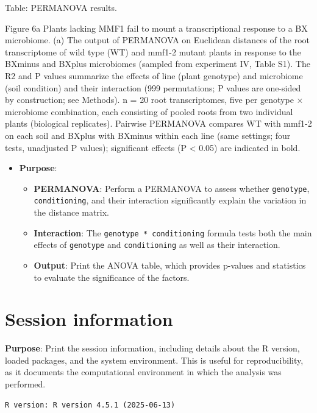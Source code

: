 \documentclass[
  11pt,
]{article}
\providecommand{\tightlist}{%
  \setlength{\itemsep}{0pt}\setlength{\parskip}{0pt}}\usepackage{longtable,booktabs,array}
\begin{document}
Table: PERMANOVA results.

Figure 6a \textbar{} Plants lacking MMF1 fail to mount a transcriptional
response to a BX microbiome. (a) The output of PERMANOVA on Euclidean
distances of the root transcriptome of wild type (WT) and mmf1-2 mutant
plants in response to the BXminus and BXplus microbiomes (sampled from
experiment IV, Table S1). The R2 and P values summarize the effects of
line (plant genotype) and microbiome (soil condition) and their
interaction (999 permutations; P values are one-sided by construction;
see Methods). n = 20 root transcriptomes, five per genotype × microbiome
combination, each consisting of pooled roots from two individual plants
(biological replicates). Pairwise PERMANOVA compares WT with mmf1-2 on
each soil and BXplus with BXminus within each line (same settings; four
tests, unadjusted P values); significant effects (P \textless{} 0.05)
are indicated in bold.

\begin{itemize}
\tightlist
\item
  \textbf{Purpose}:

  \begin{itemize}
  \tightlist
  \item
    \textbf{PERMANOVA}: Perform a PERMANOVA to assess whether
    \texttt{genotype}, \texttt{conditioning}, and their interaction
    significantly explain the variation in the distance matrix.
  \item
    \textbf{Interaction}: The \texttt{genotype\ *\ conditioning} formula
    tests both the main effects of \texttt{genotype} and
    \texttt{conditioning} as well as their interaction.
  \item
    \textbf{Output}: Print the ANOVA table, which provides p-values and
    statistics to evaluate the significance of the factors.
  \end{itemize}
\end{itemize}

\section{Session information}\label{session-information}

\textbf{Purpose}: Print the session information, including details about
the R version, loaded packages, and the system environment. This is
useful for reproducibility, as it documents the computational
environment in which the analysis was performed.

\begin{verbatim}
R version: R version 4.5.1 (2025-06-13) 
\end{verbatim}
\end{document}
